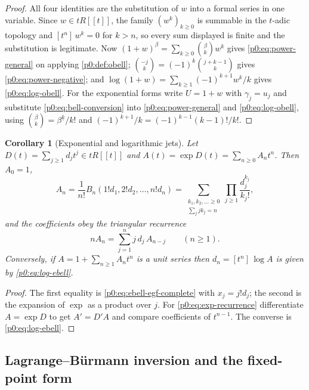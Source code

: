\documentclass[11pt,a4paper,oneside]{book}
\theoremstyle{plain}
\newtheorem{corollary}[theorem]{Corollary}
\theoremstyle{definition}
\theoremstyle{remark}
\newcommand{\Coef}[1]{[#1]\,}
\newcommand{\EB}{B}
\begin{document}
\begin{proof}
All four identities are the substitution of $w$ into a formal series in one
variable.  Since $w\in tR[[t]]$, the family $(w^k)_{k\ge0}$ is summable in the
$t$-adic topology and $\Coef{t^n}w^k=0$ for $k>n$, so every sum displayed is
finite and the substitution is legitimate.  Now
$(1+w)^\beta=\sum_{k\ge0}\binom\beta kw^k$ gives
\eqref{p0:eq:power-general} on applying \cref{p0:def:obell};
$\binom{-j}{k}=(-1)^k\binom{j+k-1}{k}$ gives
\eqref{p0:eq:power-negative}; and
$\log(1+w)=\sum_{k\ge1}(-1)^{k+1}w^k/k$ gives \eqref{p0:eq:log-obell}.
For the exponential forms write $U=1+w$ with $\gamma_j=u_j$ and substitute
\eqref{p0:eq:bell-conversion} into \eqref{p0:eq:power-general} and
\eqref{p0:eq:log-obell}, using
$\binom\beta k=\beta^{\underline k}/k!$ and $(-1)^{k+1}/k=(-1)^{k-1}(k-1)!/k!$.
\end{proof}

\begin{corollary}[Exponential and logarithmic jets]\label{p0:cor:exp-log-jets}
Let $D(t)=\sum_{j\ge1}d_jt^j\in tR[[t]]$ and $A(t)=\exp D(t)=\sum_{n\ge0}A_nt^n$.
Then $A_0=1$,
\begin{equation}\label{p0:eq:exp-bell}
 A_n=\frac1{n!}\EB_n(1!d_1,2!d_2,\dots,n!d_n)
    =\sum_{\substack{k_1,k_2,\dots\ge0\\ \sum_jjk_j=n}}\prod_{j\ge1}\frac{d_j^{k_j}}{k_j!},
\end{equation}
and the coefficients obey the triangular recurrence
\begin{equation}\label{p0:eq:exp-recurrence}
 nA_n=\sum_{j=1}^{n}j\,d_j\,A_{n-j}\qquad(n\ge1).
\end{equation}
Conversely, if $A=1+\sum_{n\ge1}A_nt^n$ is a unit series then
$d_n=\Coef{t^n}\log A$ is given by \eqref{p0:eq:log-ebell}.
\end{corollary}

\begin{proof}
The first equality is \eqref{p0:eq:ebell-egf-complete} with $x_j=j!d_j$; the
second is the expansion of $\exp$ as a product over $j$.  For
\eqref{p0:eq:exp-recurrence} differentiate $A=\exp D$ to get $A'=D'A$ and
compare coefficients of $t^{n-1}$.  The converse is
\eqref{p0:eq:log-ebell}.
\end{proof}

\subsection{Lagrange--B\"urmann inversion and the fixed-point form}
\end{document}
